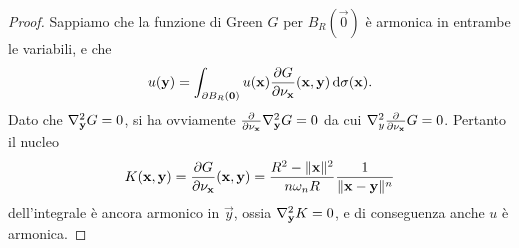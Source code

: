 \begin{proof}
    Sappiamo che la funzione di Green $G$ per $B_R(\vec 0)$ è armonica in entrambe le variabili, e che
    \begin{equation}
        u(\mathbf{y})=\int_{\partial B_R(\mathbf{0})}u(\mathbf{x})\frac{\partial {G}}{\partial {\nu_{\mathbf{x}}}}(\mathbf{x},\mathbf{y})\,\textup{d}\sigma(\mathbf{x}).
    \end{equation}
    Dato che $\nabla^2_{\mathbf{y}}G=0$, si ha ovviamente $\frac{\partial {}}{\partial {\nu_{\mathbf{x}}}}\nabla^2_{\mathbf{y}}G=0$ da cui $\nabla^2_y\frac{\partial {}}{\partial {\nu_{\mathbf{x}}}}G=0$.
    Pertanto il nucleo
    \begin{equation}
        K(\mathbf{x},\mathbf{y})=
        \frac{\partial {G}}{\partial {\nu_{\mathbf{x}}}}(\mathbf{x},\mathbf{y})=
        \frac{R^2-\lVert\mathbf{x}\rVert^2}{n\omega_n R}\frac1{\lVert\mathbf{x}-\mathbf{y}\rVert^n}
    \end{equation}
    dell'integrale è ancora armonico in $\vec y$, ossia $\nabla^2_{\mathbf{y}}K=0$, e di conseguenza anche $u$ è armonica.


\end{proof}
